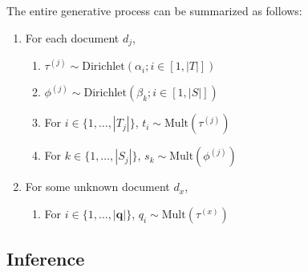 The entire generative process can be summarized as follows:
\begin{enumerate} 
  \item For each document $d_j$, \begin{enumerate}
    \item $\tau^{(j)} \sim \textrm{Dirichlet}(\alpha_i; i \in [1, |T|])$
    \item $\phi^{(j)} \sim \textrm{Dirichlet}(\beta_k; i \in [1, |S|])$
    \item For $i \in \{ 1, \ldots, |T_j| \}$, $t_i \sim \textrm{Mult}(\tau^{(j)})$ 
    \item For $k \in \{ 1, \ldots, |S_j| \}$, $s_k \sim \textrm{Mult}(\phi^{(j)})$ 
  \end{enumerate}
  \item For some unknown document $d_x$, \begin{enumerate}
    \item For $i \in \{ 1, \ldots, |\mathbf{q}|\}$, $q_i \sim \textrm{Mult}(\tau^{(x)})$
  \end{enumerate}
\end{enumerate}

\subsection{Inference}

